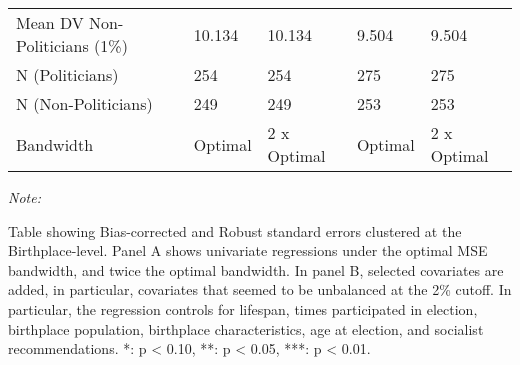 \begin{table}[!h]
\begin{threeparttable}
\begin{tabular}[t]{lllll}
\hspace{1em}Mean DV Non-Politicians (1\%) & 10.134 & 10.134 & 9.504 & 9.504\\
\hspace{1em}N (Politicians) & 254 & 254 & 275 & 275\\
\hspace{1em}N (Non-Politicians) & 249 & 249 & 253 & 253\\
\hspace{1em}Bandwidth & Optimal & 2 x Optimal & Optimal & 2 x Optimal\\
\bottomrule
\end{tabular}
\begin{tablenotes}
\item \textit{Note: } 
\item Table showing Bias-corrected and Robust standard errors clustered at the Birthplace-level. Panel A shows univariate regressions under the optimal MSE bandwidth, and twice the optimal bandwidth. In panel B, selected covariates are added, in particular, covariates that seemed to be unbalanced at the 2\% cutoff. In particular, the regression controls for lifespan, times participated in election, birthplace population, birthplace characteristics, age at election, and socialist recommendations. *: p < 0.10, **: p < 0.05, ***: p < 0.01.
\end{tablenotes}
\end{threeparttable}
\end{table}
